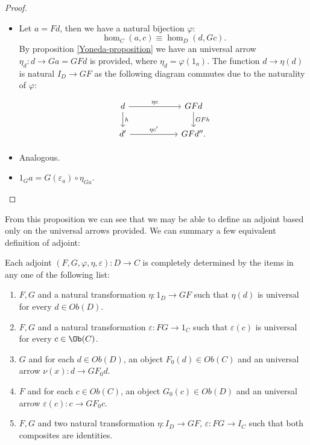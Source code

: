 \begin{proof}
  \begin{itemize}
  \item Let $a=Fd$, then we have a natural bijection $\varphi$:
    $$\hom_C(a, c)\equiv\hom_D(d, Gc).$$
    By proposition \ref{Yoneda-proposition} we have an universal arrow $\eta_d:d\to Ga=GFd$ is provided, where $\eta_d = \varphi(1_a)$. The function $d\to \eta(d)$ is natural $I_D\to GF$ as the following diagram commutes due to the naturality of $\varphi$:
    \[
      \begin{tikzpicture}
        \node {\begin{tikzcd}[column sep=20mm]
            d\ar[r,"\eta c"]\ar[d,"h"] & GFd\ar[d,"GFh"]\\
            d'\ar[r,"\eta c'"] & GFd''.
          \end{tikzcd}};
      \end{tikzpicture}
    \]

  \item Analogous.
  \item $1_Ga = G(\varepsilon_a)\circ \eta_{Ga}$.
  \end{itemize} 
\end{proof}

From this proposition we can see that we may be able to define an adjoint based only on the universal arrows provided. We can summary a few equivalent definition of adjoint:
\begin{proposition}\label{prop:equivdefinition}
  Each adjoint $(F,G,\varphi,\eta,\varepsilon):D\to C$ is completely determined by the items in any one of the following list:
  \begin{enumerate}
  \item $F,G$ and a natural transformation $\eta:1_D\to GF$ such that $\eta(d)$ is universal for every $d\in Ob(D)$.
  \item $F,G$ and a natural transformation $\varepsilon:FG\to 1_C$ such that $\varepsilon(c)$ is universal for every $c\in \Ob(C)$.
  \item $G$ and for each $d\in Ob(D)$, an object $F_0(d)\in Ob(C)$ and an universal arrow $\nu(x):d \to GF_0 d$.
  \item $F$ and for each $c\in Ob(C)$, an object $G_0(c)\in Ob(D)$ and an universal arrow $\varepsilon(c):c \to GF_0 c$.
  \item  $F,G$ and two natural transformation $\eta: I_D\to GF$, $\varepsilon: FG\to I_C$ such that both composites are identities.
  \end{enumerate}
\end{proposition}

